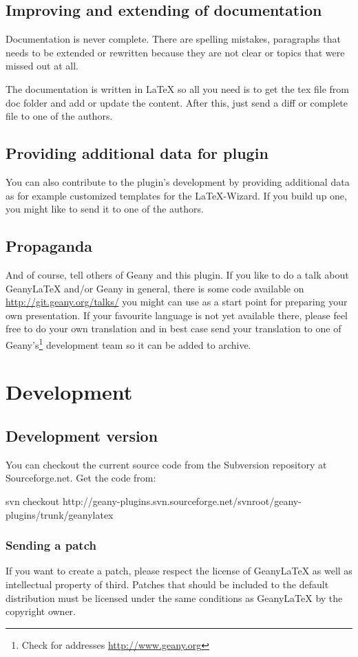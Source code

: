 \documentclass[%
paper=a4,%
fontsize=11pt,%
twoside=false,%
DIV18,
headsepline,
plainheadsepline,
footsepline,
plainfootsepline,
bibliography=totoc,%
listof=totoc,%
BCOR10mm,%
parskip=half,%
openany,%
]{scrartcl}
\begin{document}
\subsection{Improving and extending of documentation}
Documentation is never complete. There are spelling mistakes,
paragraphs that needs to be extended or rewritten because they are not
clear or topics that were missed out at all.

The documentation is written in \LaTeX{} so all you need is to get the
tex file from doc folder and add or update the content.
After this, just send a diff or complete file to one of the authors.

\subsection{Providing additional data for plugin}

You can also contribute to the plugin's development by providing
additional data as for example customized templates for the
\LaTeX-Wizard. If you build up one, you might like to send it to
one of the authors.

\subsection{Propaganda}
And of course, tell others of Geany and this plugin. If you like to do
a talk about Geany\LaTeX{} and/or Geany in general, there is some code
available on \url{http://git.geany.org/talks/} you might can use as a
start point for preparing your own presentation. If your favourite
language is not yet available there, please feel free to do your own
translation and in best case send your translation to one of
Geany's\footnote{Check for addresses \url{http://www.geany.org}}
development team so it can be added to archive.


\section{Development}
\subsection{Development version}
You can checkout the current source code from the Subversion repository
at Sourceforge.net. Get the code from:

svn checkout
http://geany-plugins.svn.sourceforge.net/svnroot/geany-plugins/trunk/geanylatex

\subsubsection{Sending a patch}
If you want to create a patch, please respect the license of
Geany\LaTeX{} as well as intellectual property of third. Patches that
should be included to the default distribution must be licensed under
the same conditions as Geany\LaTeX{} by the copyright owner.
\end{document}
